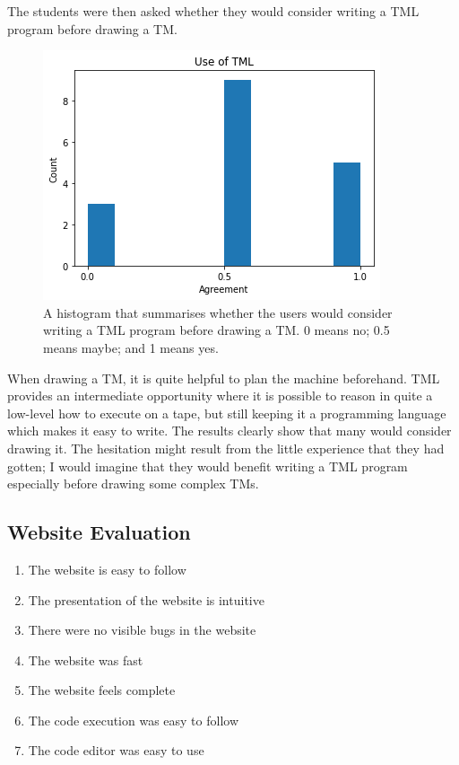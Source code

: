 The students were then asked whether they would consider writing a TML program before drawing a TM.
\begin{figure}[H]
    \centering
    \includegraphics[scale=0.75]{data/use-tml.png}
    \caption{A histogram that summarises whether the users would consider writing a TML program before drawing a TM. 0 means no; 0.5 means maybe; and 1 means yes.}
\end{figure}
\noindent When drawing a TM, it is quite helpful to plan the machine beforehand. TML provides an intermediate opportunity where it is possible to reason in quite a low-level how to execute on a tape, but still keeping it a programming language which makes it easy to write. The results clearly show that many would consider drawing it. The hesitation might result from the little experience that they had gotten; I would imagine that they would benefit writing a TML program especially before drawing some complex TMs.

\subsection{Website Evaluation}

\begin{enumerate}
    \item The website is easy to follow
    \item The presentation of the website is intuitive
    \item There were no visible bugs in the website
    \item The website was fast
    \item The website feels complete
    \item The code execution was easy to follow
    \item The code editor was easy to use
\end{enumerate}

